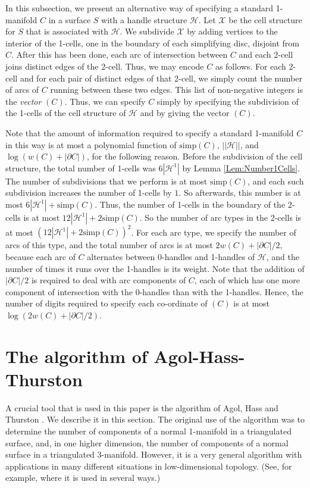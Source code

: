 \documentclass[oneside]{amsart}
\numberwithin{equation}{section}
\theoremstyle{plain}
\theoremstyle{definition}
\newcommand{\calH}{\mathcal{H}}
\newcommand{\calX}{\mathcal{X}}
\begin{document}
In this subsection, we present an alternative way of specifying a standard 1-manifold $C$ in a surface $S$ with a handle structure $\calH$.
Let $\calX$ be the cell structure for $S$ that is associated with $\calH$. We subdivide $\calX$ by
adding vertices to the interior of the 1-cells, one in the boundary of each simplifying disc, disjoint from $C$. After this has been done, each arc of intersection
between $C$ and each 2-cell joins distinct edges of the 2-cell. Thus, we may encode $C$ as follows. For each 2-cell
and for each pair of distinct edges of that 2-cell, we simply count the number of arcs of $C$ running between these
two edges. This list of non-negative integers is the \emph{vector} $(C)$. Thus, we can specify $C$ simply by 
specifying the subdivision of the 1-cells of the cell structure of $\calH$ and by giving the vector $(C)$.

Note that the amount of information required to specify a standard 1-manifold $C$ in this way is at most a polynomial function of $\mathrm{simp}(C)$, $||\calH||$, and $\log (w(C) + |\partial C|)$, 
for the following reason. Before the subdivision of the cell structure, the total number of 1-cells was $6 |\calH^1|$ by Lemma \ref{Lem:Number1Cells}.
The number of subdivisions that we perform is at most $\mathrm{simp}(C)$, and each such subdivision increases the number of 1-cells by
$1$. So afterwards, this number is at most $6|\calH^1| + \mathrm{simp}(C)$. Thus, the number of 1-cells in the boundary of the 2-cells is at most $12|\calH^1| + 2\mathrm{simp}(C)$.
So the number of arc types in the 2-cells is at most $(12 |\calH^1| + 2 \mathrm{simp}(C))^2$. For each arc type, we specify the number of arcs of this type,
and the total number of arcs is at most $2 w(C) + |\partial C|/2$, because each arc of $C$ alternates between 0-handles and 1-handles of $\calH$,
and the number of times it runs over the 1-handles is its weight. Note that the addition of $|\partial C|/2$ is required to deal with arc components of $C$, each 
of which has one more component of intersection with the 0-handles than with the 1-handles. 
Hence, the number of digits required to specify each co-ordinate of $(C)$ is at most $\log (2 w(C) + |\partial C|/2) $.



\section{The algorithm of Agol-Hass-Thurston}
\label{Sec:AHT}

A crucial tool that is used in this paper is the algorithm of Agol, Hass and Thurston \cite{AHT}. We describe it in this section. The original use of the algorithm
was to determine the number of components of a normal 1-manifold in a triangulated surface, and, in one higher dimension, the number of components
of a normal surface in a triangulated 3-manifold. However, it is a very general algorithm with applications in many different situations in low-dimensional
topology. (See, for example, \cite{Lackenby:Efficient} where it is used in several ways.)
\end{document}
